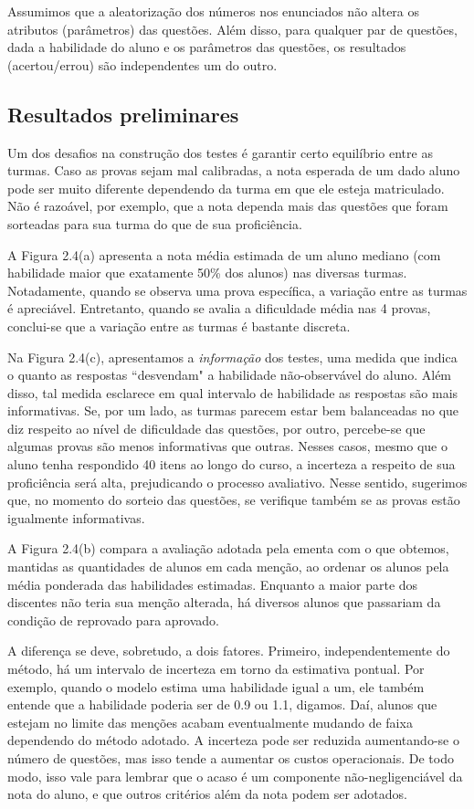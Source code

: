 \documentclass[a4paper]{report}
\begin{document}
Assumimos que a aleatorização dos números nos enunciados não altera os
atributos (parâmetros) das questões. Além disso, para qualquer par de
questões, dada a habilidade do aluno e os parâmetros das questões, os
resultados (acertou/errou) são independentes um do outro.

\subsection{Resultados preliminares}

Um dos desafios na construção dos testes é garantir certo equilíbrio
entre as turmas. Caso as provas sejam mal calibradas, a nota esperada de
um dado aluno pode ser muito diferente dependendo da turma em que ele
esteja matriculado. Não é razoável, por exemplo, que a nota dependa mais
das questões que foram sorteadas para sua turma do que de sua
proficiência.

A Figura 2.4(a) apresenta a nota média estimada de um aluno mediano (com
habilidade maior que exatamente 50\% dos alunos) nas diversas turmas.
Notadamente, quando se observa uma prova específica, a variação entre as
turmas é apreciável. Entretanto, quando se avalia a dificuldade média
nas 4 provas, conclui-se que a variação entre as turmas é bastante
discreta.

Na Figura 2.4(c), apresentamos a \emph{informação} dos testes, uma
medida que indica o quanto as respostas ``desvendam" a habilidade
não-observável do aluno. Além disso, tal medida esclarece em qual
intervalo de habilidade as respostas são mais informativas. Se, por um
lado, as turmas parecem estar bem balanceadas no que diz respeito ao
nível de dificuldade das questões, por outro, percebe-se que algumas
provas são menos informativas que outras. Nesses casos, mesmo que o
aluno tenha respondido 40 itens ao longo do curso, a incerteza a
respeito de sua proficiência será alta, prejudicando o processo
avaliativo. Nesse sentido, sugerimos que, no momento do sorteio das
questões, se verifique também se as provas estão igualmente
informativas.

A Figura 2.4(b) compara a avaliação adotada pela ementa com o que
obtemos, mantidas as quantidades de alunos em cada menção, ao ordenar os
alunos pela média ponderada das habilidades estimadas. Enquanto a maior
parte dos discentes não teria sua menção alterada, há diversos alunos
que passariam da condição de reprovado para aprovado.

A diferença se deve, sobretudo, a dois fatores. Primeiro,
independentemente do método, há um intervalo de incerteza em torno da
estimativa pontual. Por exemplo, quando o modelo estima uma habilidade
igual a um, ele também entende que a habilidade poderia ser de 0.9 ou
1.1, digamos. Daí, alunos que estejam no limite das menções acabam
eventualmente mudando de faixa dependendo do método adotado. A incerteza
pode ser reduzida aumentando-se o número de questões, mas isso tende a
aumentar os custos operacionais. De todo modo, isso vale para lembrar
que o acaso é um componente não-negligenciável da nota do aluno, e que
outros critérios além da nota podem ser adotados.
\end{document}
